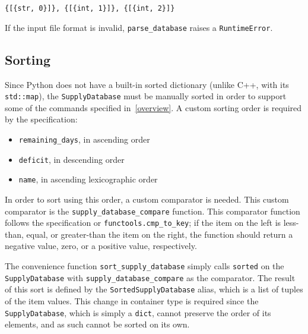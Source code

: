 \documentclass{article}
\begin{document}
			\begin{center}
				\verb|{[{str, 0}]}, {[{int, 1}]}, {[{int, 2}]}|
			\end{center}

			If the input file format is invalid, \verb|parse_database| raises a
			\verb|RuntimeError|.

		\subsection{Sorting}
			Since Python does not have a built-in sorted dictionary (unlike C++, with its
			\verb|std::map|), the \verb|SupplyDatabase| must be manually sorted in order to support
			some of the commands specified in~\ref{overview}. A custom sorting order is required by
			the specification:

			\begin{itemize}
				\item \verb|remaining_days|, in ascending order
				\item \verb|deficit|, in descending order
				\item \verb|name|, in ascending lexicographic order
			\end{itemize}

			In order to sort using this order, a custom comparator is needed. This custom
			comparator is the \verb|supply_database_compare| function. This comparator function
			follows the specification or \verb|functools.cmp_to_key|; if the item on the left is
			less-than, equal, or greater-than the item on the right, the function should return
			a negative value, zero, or a positive value, respectively.

			The convenience function \verb|sort_supply_database| simply calls \verb|sorted| on
			the \verb|SupplyDatabase| with \verb|supply_database_compare| as the comparator. The
			result of this sort is defined by the \verb|SortedSupplyDatabase| alias, which is a
			list of tuples of the item values. This change in container type is required since
			the \verb|SupplyDatabase|, which is simply a \verb|dict|, cannot preserve the order of
			its elements, and as such cannot be sorted on its own.
\end{document}
